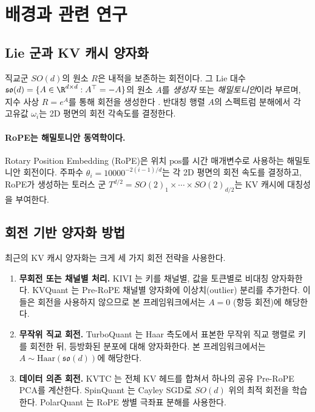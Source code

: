 \section{배경과 관련 연구}
\label{sec:background}

\subsection{Lie 군과 KV 캐시 양자화}

직교군 $SO(d)$의 원소 $R$은 내적을 보존하는 회전이다. 그 Lie 대수 $\mathfrak{so}(d) = \{A \in \R^{d \times d} : A^\top = -A\}$의 원소 $A$를 \emph{생성자} 또는 \emph{해밀토니안}이라 부르며, 지수 사상 $R = e^A$를 통해 회전을 생성한다 \citep{hall2015lie}. 반대칭 행렬 $A$의 스펙트럼 분해에서 각 고유값 $\omega_i$는 2D 평면의 회전 각속도를 결정한다.

\paragraph{RoPE는 해밀토니안 동역학이다.}
Rotary Position Embedding (RoPE)은 위치 $\mathrm{pos}$를 시간 매개변수로 사용하는 해밀토니안 회전이다. 주파수 $\theta_i = 10000^{-2(i-1)/d}$는 각 2D 평면의 회전 속도를 결정하고, RoPE가 생성하는 토러스 군 $T^{d/2} = SO(2)_1 \times \cdots \times SO(2)_{d/2}$는 KV 캐시에 대칭성을 부여한다.

\subsection{회전 기반 양자화 방법}

최근의 KV 캐시 양자화는 크게 세 가지 회전 전략을 사용한다.

\begin{enumerate}[leftmargin=1.5em,itemsep=2pt]
\item \textbf{무회전 또는 채널별 처리.} KIVI \citep{liu2024kivi}는 키를 채널별, 값을 토큰별로 비대칭 양자화한다. KVQuant \citep{hooper2024kvquant}는 Pre-RoPE 채널별 양자화에 이상치(outlier) 분리를 추가한다. 이들은 회전을 사용하지 않으므로 본 프레임워크에서는 $A=0$ (항등 회전)에 해당한다.

\item \textbf{무작위 직교 회전.} TurboQuant \citep{zandieh2025turboquant}는 Haar 측도에서 표본한 무작위 직교 행렬로 키를 회전한 뒤, 등방화된 분포에 대해 양자화한다. 본 프레임워크에서는 $A \sim \mathrm{Haar}(\mathfrak{so}(d))$에 해당한다.

\item \textbf{데이터 의존 회전.} KVTC \citep{staniszewski2025kvtc}는 전체 KV 헤드를 합쳐서 하나의 공유 Pre-RoPE PCA를 계산한다. SpinQuant \citep{liu2024spinquant}는 Cayley SGD로 $SO(d)$ 위의 최적 회전을 학습한다. PolarQuant \citep{wu2025polarquant}는 RoPE 쌍별 극좌표 분해를 사용한다.
\end{enumerate}

